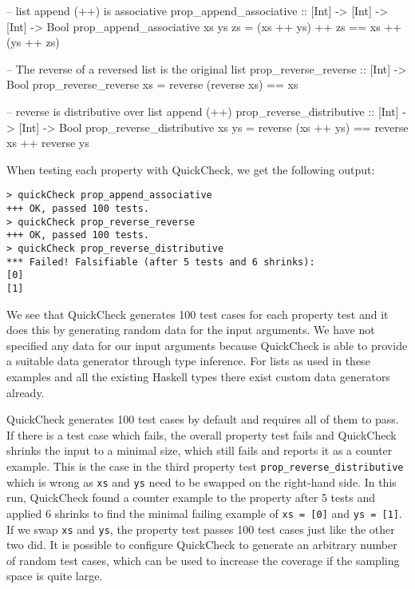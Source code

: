 \begin{HaskellCode}
-- list append (++) is associative
prop_append_associative :: [Int] -> [Int] -> [Int] -> Bool
prop_append_associative xs ys zs = (xs ++ ys) ++ zs == xs ++ (ys ++ zs)

-- The reverse of a reversed list is the original list
prop_reverse_reverse :: [Int] -> Bool
prop_reverse_reverse xs = reverse (reverse xs) == xs

-- reverse is distributive over list append (++)
prop_reverse_distributive :: [Int] -> [Int] -> Bool
prop_reverse_distributive xs ys = reverse (xs ++ ys) == reverse xs ++ reverse ys
\end{HaskellCode}

When testing each property with QuickCheck, we get the following output:

\begin{verbatim}
> quickCheck prop_append_associative
+++ OK, passed 100 tests.
> quickCheck prop_reverse_reverse
+++ OK, passed 100 tests.
> quickCheck prop_reverse_distributive
*** Failed! Falsifiable (after 5 tests and 6 shrinks):    
[0]
[1]
\end{verbatim}

We see that QuickCheck generates 100 test cases for each property test and it does this by generating random data for the input arguments. We have not specified any data for our input arguments because QuickCheck is able to provide a suitable data generator through type inference. For lists as used in these examples and all the existing Haskell types there exist custom data generators already. %

QuickCheck generates 100 test cases by default and requires all of them to pass. If there is a test case which fails, the overall property test fails and QuickCheck shrinks the input to a minimal size, which still fails and reports it as a counter example. This is the case in the third property test \texttt{prop\_reverse\_distributive} which is wrong as \texttt{xs} and \texttt{ys} need to be swapped on the right-hand side. In this run, QuickCheck found a counter example to the property after 5 tests and applied 6 shrinks to find the minimal failing example of \texttt{xs = [0]} and \texttt{ys = [1]}. If we swap \texttt{xs} and \texttt{ys}, the property test passes 100 test cases just like the other two did. It is possible to configure QuickCheck to generate an arbitrary number of random test cases, which can be used to increase the coverage if the sampling space is quite large.